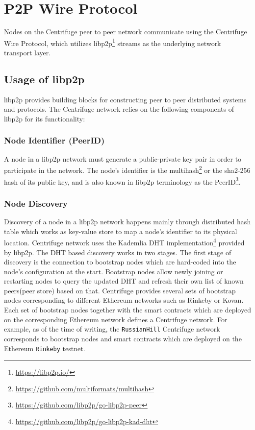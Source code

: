 \section{P2P Wire Protocol}

Nodes on the Centrifuge peer to peer network communicate using the Centrifuge Wire Protocol, which utilizes libp2p\footnote{\url{https://libp2p.io/}} streams as the underlying network transport layer.

\subsection{Usage of libp2p}
libp2p provides building blocks for constructing peer to peer distributed systems and protocols. The Centrifuge network relies on the following components of libp2p for its functionality: 

\subsubsection{Node Identifier (PeerID)} \label{sec:node_id}
A node in a libp2p network must generate a public-private key pair in order to participate in the network. The node's identifier is the multihash\footnote{\url{https://github.com/multiformats/multihash}} or the sha2-256 hash of its public key, and is also known in libp2p terminology as the PeerID\footnote{\url{https://github.com/libp2p/go-libp2p-peer}}. 

\subsubsection{Node Discovery}
Discovery of a node in a libp2p network happens mainly through distributed hash table which works as key-value store to map a node's identifier to its physical location. Centrifuge network uses the Kademlia DHT implementation\footnote{\url{https://github.com/libp2p/go-libp2p-kad-dht}} provided by libp2p. The DHT based discovery works in two stages. The first stage of discovery is the connection to bootstrap nodes which are hard-coded into the node's configuration at the start. Bootstrap nodes allow newly joining or restarting nodes to query the updated DHT and refresh their own list of known peers(peer store) based on that. Centrifuge provides several sets of bootstrap nodes corresponding to different Ethereum networks such as Rinkeby or Kovan. Each set of bootstrap nodes together with the smart contracts which are deployed on the corresponding Ethereum network defines a Centrifuge network. For example, as of the time of writing, the \texttt{RussianHill} Centrifuge network corresponds to bootstrap nodes and smart contracts which are deployed on the Ethereum \texttt{Rinkeby} testnet. 

